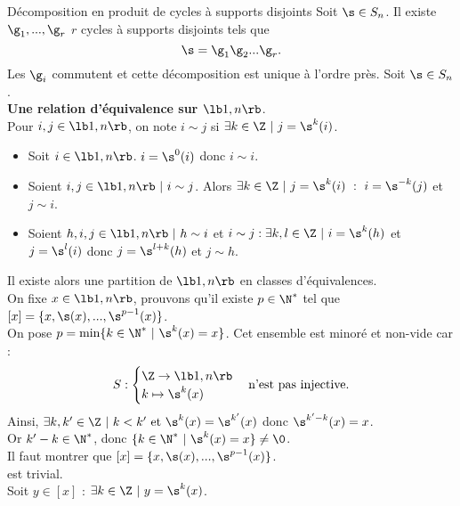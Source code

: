 \documentclass[11pt]{article}
\begin{document}
\begin{thm}{Décomposition en produit de cycles à supports disjoints}{}
    Soit $\s\in S_n$. Il existe $\g_1,...,\g_r$ $r$ cycles à supports disjoints tels que
    \begin{equation*}
        \s=\g_1\g_2...\g_r.
    \end{equation*}
    Les $\g_i$ commutent et cette décomposition est unique à l'ordre près.
    \tcblower
    Soit $\s\in S_n$.\\
    \textbf{Une relation d'équivalence sur $\lb1,n\rb$}.\\
    Pour $i,j\in\lb1,n\rb$, on note $i\sim j$ si $\exists k \in \Z ~ | ~ j = \s^k(i)$.
    \begin{itemize}[topsep=0pt,itemsep=-0.9 ex]
        \item Soit $i\in\lb1,n\rb$. $i=\s^0(i)$ donc $i \sim i$.
        \item Soient $i,j\in\lb1,n\rb ~ | ~ i \sim j$. Alors $\exists k \in \Z ~ | ~ j = \s^k(i) ~ : ~ i = \s^{-k}(j)$ et $j \sim i$.
        \item Soient $h,i,j\in\lb1,n\rb ~ | ~ h \sim i$ et $i \sim j : \exists k,l \in \Z ~ | ~ i = \s^k(h)$ et $j=\s^l(i)$ donc $j=\s^{l+k}(h)$ et $j \sim h$.
    \end{itemize}
    Il existe alors une partition de $\lb1,n\rb$ en classes d'équivalences.\\
    On fixe $x\in\lb1,n\rb$, prouvons qu'il existe $p\in\N^*$ tel que $[x]=\{x,\s(x),...,\s^{p-1}(x)\}$.\\
    On pose $p=\min\{k\in\N^* ~ | ~ \s^k(x)=x\}$. Cet ensemble est minoré et non-vide car :
    \begin{equation*}
        S : \begin{cases}
            \Z \to \lb1,n\rb\\
            k\mapsto \s^k(x)
        \end{cases}
        \text{n'est pas injective.}
    \end{equation*}
    Ainsi, $\exists k,k' \in \Z ~ | ~ k < k' ~ \text{et} ~ \s^k(x)=\s^{k'}(x)$ donc $\s^{k'-k}(x)=x$.\\
    Or $k'-k\in\N^*$, donc $\{k\in\N^* ~ | ~ \s^k(x)=x\}\neq\0$.\\
    Il faut montrer que $[x]=\{x,\s(x),...,\s^{p-1}(x)\}$.\\
    \fbox{$\supset$} est trivial.\\
    \fbox{$\subset$} Soit $y\in[x]$ : $\exists k \in \Z ~ | ~ y = \s^k(x)$.\\

\end{thm}
\end{document}
